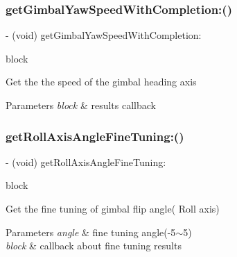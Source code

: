 \subsubsection{\texorpdfstring{get\+Gimbal\+Yaw\+Speed\+With\+Completion\+:()}{getGimbalYawSpeedWithCompletion:()}}
{\footnotesize\ttfamily -\/ (void) get\+Gimbal\+Yaw\+Speed\+With\+Completion\+: \begin{DoxyParamCaption}\item[{(void($^\wedge$)(float speed, N\+S\+Error $\ast$\hyperlink{group___p_v_s_d_k___c_o_r_e___a_p_i___m_o_u_n_t_c_o_n_t_r_o_l_ga5a1de33b230662127568783314b4a54d}{\+\_\+\+Nullable} error))}]{block }\end{DoxyParamCaption}}

Get the the speed of the gimbal heading axis


\begin{DoxyParams}{Parameters}
{\em block} & results callback \\
\hline
\end{DoxyParams}
\mbox{\label{interface_p_v_gimabal_ae4e3e7f2c3e3672a56bd67a8b9212aea}} 
\subsubsection{\texorpdfstring{get\+Roll\+Axis\+Angle\+Fine\+Tuning\+:()}{getRollAxisAngleFineTuning:()}}
{\footnotesize\ttfamily -\/ (void) get\+Roll\+Axis\+Angle\+Fine\+Tuning\+: \begin{DoxyParamCaption}\item[{(void($^\wedge$)(float angle, N\+S\+Error $\ast$\hyperlink{group___p_v_s_d_k___c_o_r_e___a_p_i___m_o_u_n_t_c_o_n_t_r_o_l_ga5a1de33b230662127568783314b4a54d}{\+\_\+\+Nullable} error))}]{block }\end{DoxyParamCaption}}

Get the fine tuning of gimbal flip angle( Roll axis)


\begin{DoxyParams}{Parameters}
{\em angle} & fine tuning angle(-\/5$\sim$5) \\
\hline
{\em block} & callback about fine tuning results \\
\hline
\end{DoxyParams}
\mbox{\label{interface_p_v_gimabal_ad89b5c7c17d403b8c19e64b7a827db37}} 

